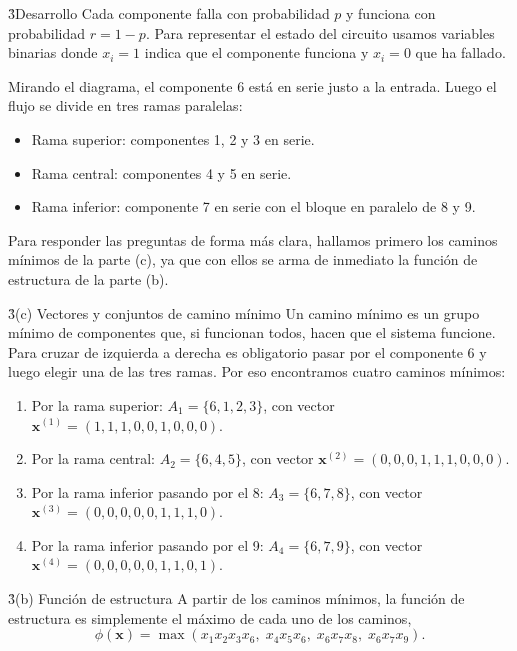 \documentclass[practices.tex]{subfiles}%
\begin{document}
\vspace{3mm}
\h3{Desarrollo}
Cada componente falla con probabilidad $p$ y funciona con probabilidad $r = 1 - p$. Para representar el estado del circuito usamos variables binarias donde $x_i = 1$ indica que el componente funciona y $x_i = 0$ que ha fallado.

Mirando el diagrama, el componente 6 está en serie justo a la entrada. Luego el flujo se divide en tres ramas paralelas:
\begin{itemize}
    \item Rama superior: componentes 1, 2 y 3 en serie.
    \item Rama central: componentes 4 y 5 en serie.
    \item Rama inferior: componente 7 en serie con el bloque en paralelo de 8 y 9.
\end{itemize}

Para responder las preguntas de forma más clara, hallamos primero los caminos mínimos de la parte (c), ya que con ellos se arma de inmediato la función de estructura de la parte (b).

\vspace{3mm}
\h3{(c) Vectores y conjuntos de camino mínimo}
Un camino mínimo es un grupo mínimo de componentes que, si funcionan todos, hacen que el sistema funcione. Para cruzar de izquierda a derecha es obligatorio pasar por el componente 6 y luego elegir una de las tres ramas. Por eso encontramos cuatro caminos mínimos:

\begin{enumerate}
    \item Por la rama superior: $A_1 = \{6, 1, 2, 3\}$, con vector $\mathbf{x}^{(1)} = (1, 1, 1, 0, 0, 1, 0, 0, 0)$.
    \item Por la rama central: $A_2 = \{6, 4, 5\}$, con vector $\mathbf{x}^{(2)} = (0, 0, 0, 1, 1, 1, 0, 0, 0)$.
    \item Por la rama inferior pasando por el 8: $A_3 = \{6, 7, 8\}$, con vector $\mathbf{x}^{(3)} = (0, 0, 0, 0, 0, 1, 1, 1, 0)$.
    \item Por la rama inferior pasando por el 9: $A_4 = \{6, 7, 9\}$, con vector $\mathbf{x}^{(4)} = (0, 0, 0, 0, 0, 1, 1, 0, 1)$.
\end{enumerate}

\vspace{3mm}
\h3{(b) Función de estructura}
A partir de los caminos mínimos, la función de estructura es simplemente el máximo de cada uno de los caminos,
\begin{equation*}
    \phi(\mathbf{x}) = \max(x_1 x_2 x_3 x_6, \; x_4 x_5 x_6, \; x_6 x_7 x_8, \; x_6 x_7 x_9).
\end{equation*}
\end{document}
